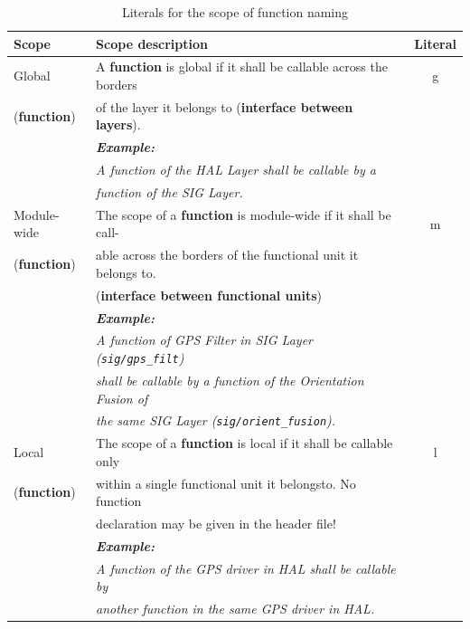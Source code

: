 \begin{table}[H]
\begin{tabular}{l|l|c}
\hline
\textbf{Scope} 		& \textbf{Scope description}														& \textbf{Literal}\\
\hline
Global						&	A \textbf{function} is global if it shall be callable across the borders	&	g\\
(\textbf{function})				&	  of the layer it belongs to (\textbf{interface between layers}).																		& \\
									&	\textit{\textbf{Example:}}																							&	\\
									& \textit{A function of the HAL Layer shall be callable by a}							& \\
									& \textit{function of the SIG Layer.}					& \\
\hline
Module-wide				&	The scope of a \textbf{function} is module-wide if it	shall be call-		&	m\\
(\textbf{function})				&	 able across the borders of the functional unit	it belongs to.	& \\
									& (\textbf{interface between functional units})														& \\
									&	\textit{\textbf{Example:}}																							&	\\
									& \textit{A function of GPS Filter in SIG Layer (\texttt{sig/gps\_filt})}	& \\
									& \textit{shall be callable by a function of the Orientation Fusion of}		& \\
									& \textit{the same SIG Layer (\texttt{sig/orient\_fusion}).}							& \\
\hline

Local							&	The scope of a \textbf{function} is local if it shall	be callable only	&	l\\
(\textbf{function})	&	  within a single functional unit it belongsto.	No function						& \\
									&   declaration may be given in the header file!													& \\
									&	\textit{\textbf{Example:}}																							&	\\
									& \textit{A function of the GPS driver in HAL shall be callable by}				& \\
									& \textit{another function in the same GPS driver in HAL.}								& \\
\hline
\end{tabular}
\caption{Literals for the scope of function naming}
\label{tab:style:varNaming:ListOfScopeFunc}
\end{table}

